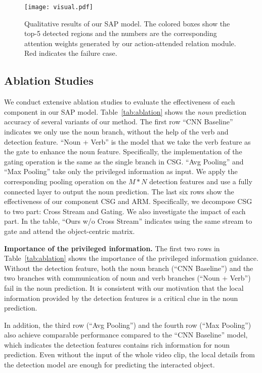\documentclass[letterpaper]{article} \usepackage{aaai20}  \usepackage{times}  \usepackage{helvet} \usepackage{courier}  \usepackage[hyphens]{url}  \usepackage{graphicx} \urlstyle{rm} \def\UrlFont{\rm}  \usepackage{graphicx}  \frenchspacing  \setlength{\pdfpagewidth}{8.5in}  \setlength{\pdfpageheight}{11in}  \usepackage{amsfonts,amssymb}
\begin{document}
\begin{figure*}[t]
\center
\texttt{[image: visual.pdf]}
\caption{
Qualitative results of our SAP model. The colored boxes show the top-5 detected regions and the numbers are the corresponding attention weights generated by our action-attended relation module. Red indicates the failure case.
}
\label{fig:visual}  
\end{figure*}


\subsection{Ablation Studies}
We conduct extensive ablation studies to evaluate the effectiveness of each component in our SAP model. 
Table~\ref{tab:ablation} shows the \textit{noun} prediction accuracy of several variants of our method.
The first row ``CNN Baseline'' indicates we only use the noun branch, without the help of the verb and detection feature.
``Noun + Verb'' is the model that we take the verb feature as the gate to enhance the noun feature. Specifically, the implementation of the gating operation is the same as the single branch in CSG.
``Avg Pooling'' and ``Max Pooling'' take only the privileged information as input. We apply the corresponding pooling operation on the $M*N$ detection features and use a fully connected layer to output the noun prediction. 
The last six rows show the effectiveness of our component CSG and ARM. Specifically, we decompose CSG to two part: Cross Stream and Gating. We also investigate the impact of each part.
In the table, ``Ours w/o Cross Stream'' indicates using the same stream to gate and attend the object-centric matrix. 



\textbf{Importance of the privileged information.}
The first two rows in Table~\ref{tab:ablation} shows the importance of the privileged information guidance. 
Without the detection feature, both the noun branch (``CNN Baseline'') and the two branches with communication of noun and verb branches (``Noun + Verb'') fail in the noun prediction.
It is consistent with our motivation that the local information provided by the detection features is a critical clue in the noun prediction.

In addition, the third row (``Avg Pooling'') and the fourth row (``Max Pooling'') also achieve comparable performance compared to the ``CNN Baseline'' model, which indicates the detection features contains rich information for noun prediction. Even without the input of the whole video clip, the local details from the detection model are enough for predicting the interacted object.
\end{document}
